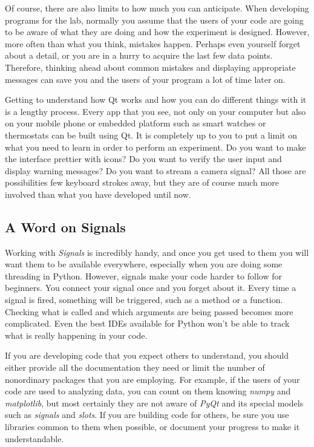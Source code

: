 Of course, there are also limits to how much you can anticipate. When
developing programs for the lab, normally you assume that the users of
your code are going to be aware of what they are doing and how the
experiment is designed. However, more often than what you think,
mistakes happen. Perhaps even yourself forget about a detail, or you are
in a hurry to acquire the last few data points. Therefore, thinking
ahead about common mistakes and displaying appropriate messages can save
you and the users of your program a lot of time later on.

Getting to understand how Qt works and how you can do different things
with it is a lengthy process. Every app that you see, not only on your
computer but also on your mobile phone or embedded platform such as
smart watches or thermostats can be built using Qt. It is completely up
to you to put a limit on what you need to learn in order to perform an
experiment. Do you want to make the interface prettier with icons? Do
you want to verify the user input and display warning messages? Do you
want to stream a camera signal? All those are possibilities few keyboard
strokes away, but they are of course much more involved than what you
have developed until now.

\subsection{A Word on Signals}\label{a-word-onsignals}
Working with \emph{Signals} is incredibly handy, and once you get used
to them you will want them to be available everywhere, especially when
you are doing some threading in Python. However, signals make your code
harder to follow for beginners. You connect your signal once and you
forget about it. Every time a signal is fired, something will be
triggered, such as a method or a function. Checking what is called and
which arguments are being passed becomes more complicated. Even the best
IDEs available for Python won't be able to track what is really
happening in your code.

If you are developing code that you expect others to understand, you
should either provide all the documentation they need or limit the number of nonordinary packages that you are employing. For example, if
the users of your code are used to analyzing data, you can count on them
knowing \emph{numpy} and \emph{matplotlib}, but most certainly they are
not aware of \emph{PyQt} and its special models such as \emph{signals}
and \emph{slots}. If you are building code for others, be sure you use
libraries common to them when possible, or document your progress to
make it understandable.
